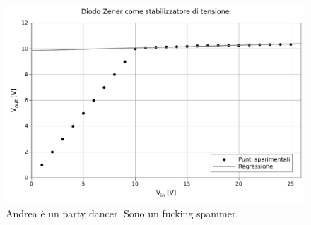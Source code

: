 \begin{figure}
    \includegraphics[scale=0.7]{stab.pdf}
    \caption{Andrea è un party dancer. Sono un fucking spammer.}
    \label{fig:resistenza}
\end{figure}
